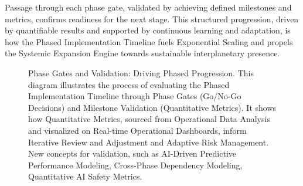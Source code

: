 \documentclass[fontsize=10pt, oneside, DIV=calc]{scrartcl}
\begin{document}
\medskip

\noindent
Passage through each phase gate, validated by achieving defined milestones and metrics, confirms readiness for the next stage. This structured progression, driven by quantifiable results and supported by continuous learning and adaptation, is how the Phased Implementation Timeline fuels Exponential Scaling and propels the Systemic Expansion Engine towards sustainable interplanetary presence.

\begin{figure}[H]
  \centering
  \noindent
  \begin{minipage}{\textwidth}
    \centering
    \caption{Phase Gates and Validation: Driving Phased Progression. This diagram illustrates the process of evaluating the Phased Implementation Timeline through Phase Gates (Go/No-Go Decisions) and Milestone Validation (Quantitative Metrics). It shows how Quantitative Metrics, sourced from Operational Data Analysis and visualized on Real-time Operational Dashboards, inform Iterative Review and Adjustment and Adaptive Risk Management. New concepts for validation, such as AI-Driven Predictive Performance Modeling, Cross-Phase Dependency Modeling, Quantitative AI Safety Metrics.}
  \end{minipage}
\end{figure}
\end{document}
